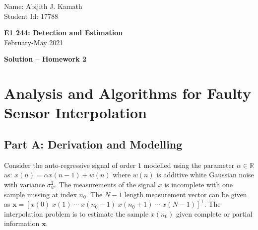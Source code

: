 \documentclass[11pt]{article}
\newcommand{\bx}{\mathbf{x}}
\newcommand{\rr}{\mathbb{R}}
\newcommand{\TT}{\mathsf{T}}
\begin{document}
\thispagestyle{empty}

{\small
\begin{flushleft}
   Name: Abijith J. Kamath\\
   Student Id: 17788
\end{flushleft}
}
\vspace{2ex}
\begin{center}
    {\Large\bf E1 244: Detection and Estimation}\\
    February-May 2021

\vspace{5mm}
{\bf Solution -- Homework 2}
\end{center}
\vspace{5mm}

\section*{Analysis and Algorithms for Faulty Sensor Interpolation}


\subsection*{Part A: Derivation and Modelling}
\label{subsec:partA}
Consider the auto-regressive signal of order $1$ modelled using the parameter $\alpha \in \rr$ as: $x(n) = \alpha x(n-1) + w(n)$ where $w(n)$ is additive white Gaussian noise with variance $\sigma_{w}^{2}$. The measurements of the signal $x$ is incomplete with one sample missing at index $n_{0}$. The $N-1$ length measurement vector can be given as $\bx = [ x(0) \; x(1) \; \cdots \; x(n_{0}-1) \; x(n_{0}+1) \; \cdots \; x(N-1) ]^{\TT}$. The interpolation problem is to estimate the sample $x(n_{0})$ given complete or partial information $\bx$.
\end{document}
